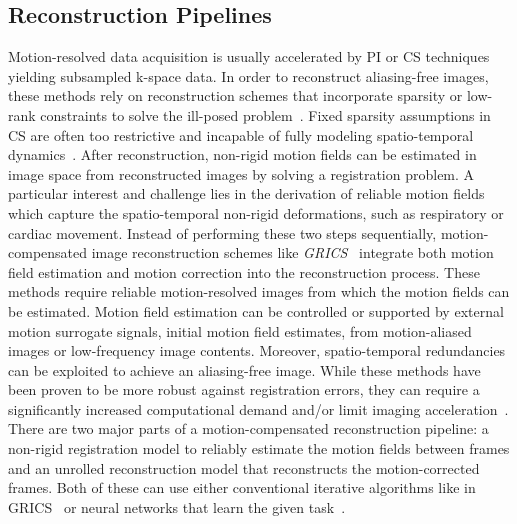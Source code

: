 \documentclass[english,version-2022-01]{uzl-thesis} %
\begin{document}
\subsection{Reconstruction Pipelines} \label{SubSec:ReconstructionPipelines}
Motion-resolved data acquisition is usually accelerated by PI or CS techniques yielding subsampled k-space data. In order to reconstruct aliasing-free images, these methods rely on reconstruction schemes that incorporate sparsity or low-rank constraints to solve the ill-posed problem~\cite{CS-MRI,ParallelMRI,LowRank+SparseMRI}. Fixed sparsity assumptions in CS are often too restrictive and incapable of fully modeling spatio-temporal dynamics~\cite{Kuestner2022}. 
After reconstruction, non-rigid motion fields can be estimated in image space from reconstructed images by solving a registration problem. A particular interest and challenge lies in the derivation of reliable motion fields which capture the spatio-temporal non-rigid deformations, such as respiratory or cardiac movement. Instead of performing these two steps sequentially, motion-compensated image reconstruction schemes like \emph{GRICS}~\cite{GRICS} integrate both motion field estimation and motion correction into the reconstruction process. These methods require reliable motion-resolved images from which the motion fields can be estimated. Motion field estimation can be controlled or supported by external motion surrogate signals, initial motion field estimates, from motion-aliased images or low-frequency image contents. Moreover, spatio-temporal redundancies can be exploited to achieve an aliasing-free image. While these methods have been proven to be more robust against registration errors, they can require a significantly increased computational demand and/or limit imaging acceleration~\cite{Kuestner2022}.\\
There are two major parts of a motion-compensated reconstruction pipeline: a non-rigid registration model to reliably estimate the motion fields between frames and an unrolled reconstruction model that reconstructs the motion-corrected frames. Both of these can use either conventional iterative algorithms like in GRICS~\cite{GRICS} or neural networks that learn the given task~\cite{Kuestner2022}.
\end{document}

